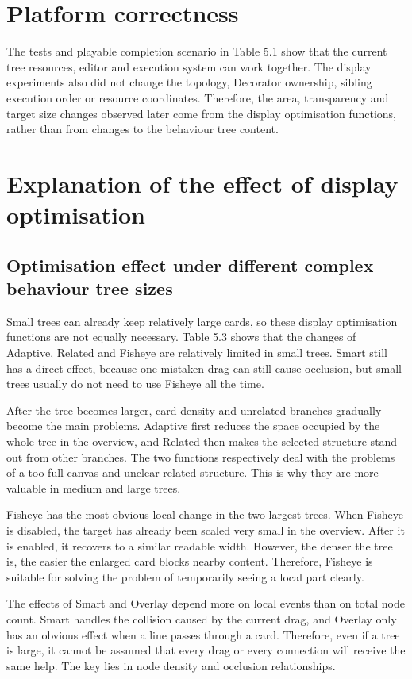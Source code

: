 \documentclass[11pt,a4paper,oneside,extrafontsizes]{memoir}
\begin{document}
\section{Platform correctness}

The tests and playable completion scenario in Table 5.1 show that the current tree resources, editor and execution system can work together. The display experiments also did not change the topology, Decorator ownership, sibling execution order or resource coordinates. Therefore, the area, transparency and target size changes observed later come from the display optimisation functions, rather than from changes to the behaviour tree content.

\section{Explanation of the effect of display optimisation}

\subsection{Optimisation effect under different complex behaviour tree sizes}

Small trees can already keep relatively large cards, so these display optimisation functions are not equally necessary. Table 5.3 shows that the changes of Adaptive, Related and Fisheye are relatively limited in small trees. Smart still has a direct effect, because one mistaken drag can still cause occlusion, but small trees usually do not need to use Fisheye all the time.

After the tree becomes larger, card density and unrelated branches gradually become the main problems. Adaptive first reduces the space occupied by the whole tree in the overview, and Related then makes the selected structure stand out from other branches. The two functions respectively deal with the problems of a too-full canvas and unclear related structure. This is why they are more valuable in medium and large trees.

Fisheye has the most obvious local change in the two largest trees. When Fisheye is disabled, the target has already been scaled very small in the overview. After it is enabled, it recovers to a similar readable width. However, the denser the tree is, the easier the enlarged card blocks nearby content. Therefore, Fisheye is suitable for solving the problem of temporarily seeing a local part clearly.

The effects of Smart and Overlay depend more on local events than on total node count. Smart handles the collision caused by the current drag, and Overlay only has an obvious effect when a line passes through a card. Therefore, even if a tree is large, it cannot be assumed that every drag or every connection will receive the same help. The key lies in node density and occlusion relationships.
\end{document}
